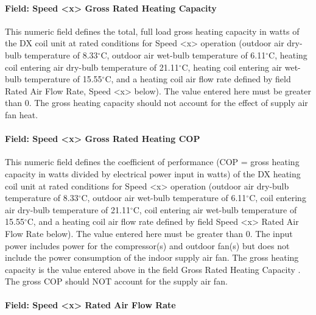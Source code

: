\paragraph{Field: Speed \textless{}x\textgreater{} Gross Rated Heating Capacity}\label{field-speed-x-gross-rated-heating-capacity}

This numeric field defines the total, full load gross heating capacity in watts of the DX coil unit at rated conditions for Speed \textless{}x\textgreater{} operation (outdoor air dry-bulb temperature of 8.33$^\circ$C, outdoor air wet-bulb temperature of 6.11$^\circ$C, heating coil entering air dry-bulb temperature of 21.11$^\circ$C, heating coil entering air wet-bulb temperature of 15.55$^\circ$C, and a heating coil air flow rate defined by field Rated Air Flow Rate, Speed \textless{}x\textgreater{} below). The value entered here must be greater than 0. The gross heating capacity should not account for the effect of supply air fan heat.

\paragraph{Field: Speed \textless{}x\textgreater{} Gross Rated Heating COP}\label{field-speed-x-gross-rated-heating-cop}

This numeric field defines the coefficient of performance (COP = gross heating capacity in watts divided by electrical power input in watts) of the DX heating coil unit at rated conditions for Speed \textless{}x\textgreater{} operation (outdoor air dry-bulb temperature of 8.33$^\circ$C, outdoor air wet-bulb temperature of 6.11$^\circ$C, coil entering air dry-bulb temperature of 21.11$^\circ$C, coil entering air wet-bulb temperature of 15.55$^\circ$C, and a heating coil air flow rate defined by field Speed \textless{}x\textgreater{} Rated Air Flow Rate below). The value entered here must be greater than 0. The input power includes power for the compressor(s) and outdoor fan(s) but does not include the power consumption of the indoor supply air fan. The gross heating capacity is the value entered above in the field Gross Rated Heating Capacity . The gross COP should NOT account for the supply air fan.

\paragraph{Field: Speed \textless{}x\textgreater{} Rated Air Flow Rate}\label{field-speed-x-rated-air-flow-rate-1}

